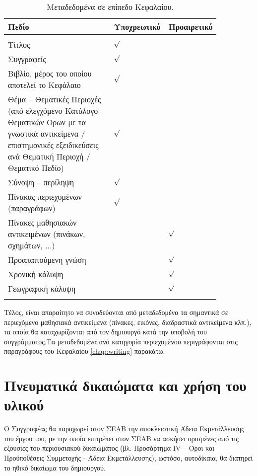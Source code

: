 \begin{table} [h!] \centering
\caption{Μεταδεδομένα σε επίπεδο Κεφαλαίου.}
\vspace{2mm}
\begin{tabular} {p{0.55\linewidth} p{0.15\linewidth} p{0.15\linewidth}}
\hline
	\textbf{Πεδίο}	&\textbf{Υποχρεωτικό}	&\textbf{Προαιρετικό}\tabularnewline
\hline
		&	    &	\tabularnewline
Τίτλος		& \centering $\surd$	    &\tabularnewline
Συγγραφείς	& \centering $\surd$	    	&	\tabularnewline
Βιβλίο, μέρος του οποίου αποτελεί το Κεφάλαιο & \centering $\surd$ & 	\tabularnewline
Θέμα – Θεματικές Περιοχές (από ελεγχόμενο Κατάλογο
Θεματικών Όρων με τα γνωστικά αντικείμενα /
επιστημονικές εξειδικεύσεις ανά Θεματική Περιοχή /
Θεματικό Πεδίο)	&\centering $\surd$	    &	\tabularnewline
Σύνοψη – περίληψη	&\centering $\surd$	    &	\tabularnewline
Πίνακας περιεχομένων (παραγράφων)	&\centering $\surd$	    &	\tabularnewline
Πίνακες μαθησιακών αντικειμένων (πινάκων, σχημάτων, ...)	&	    &\centering $\surd$	\tabularnewline
Προαπαιτούμενη γνώση	&	    &\centering $\surd$	\tabularnewline
Χρονική κάλυψη	&	    & \centering $\surd$	\tabularnewline
Γεωγραφική κάλυψη	&	    &\centering $\surd$	\tabularnewline
	&	    &	\tabularnewline
\hline
\end{tabular}
\label{table:chapter_metadata}
\end{table}

Τέλος, είναι απαραίτητο να συνοδεύονται από μεταδεδομένα τα σημαντικά σε περιεχόμενο
μαθησιακά αντικείμενα (πίνακες, εικόνες, διαδραστικά αντικείμενα κλπ.), τα οποία θα
καταχωρίζονται από τον δημιουργό κατά την υποβολή του συγγράμματος.Τα μεταδεδομένα
ανά κατηγορία περιεχομένου περιγράφονται στις παραγράφους του Κεφαλαίου \ref{chap:writing}
παρακάτω.
\section{Πνευματικά δικαιώματα και χρήση του υλικού}

Ο Συγγραφέας θα παραχωρεί στον ΣΕΑΒ την αποκλειστική Άδεια Εκμετάλλευσης του
έργου του, με την οποία επιτρέπει στον ΣΕΑΒ να ασκήσει ορισμένες από τις εξουσίες του
περιουσιακού δικαιώματος (βλ. Προσάρτημα IV – Όροι και Προϋποθέσεις Συμμετοχής
- Άδεια Εκμετάλλευσης), ωστόσο, αυτοδίκαια, θα διατηρεί το ηθικό δικαίωμα του
δημιουργού.
